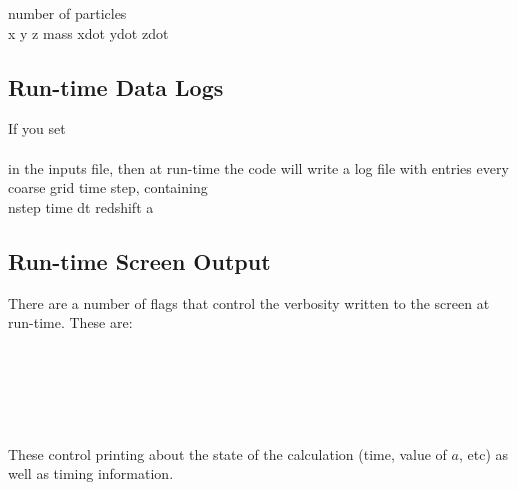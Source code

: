 \noindent number of particles \\ 
x y z mass xdot ydot zdot \\

\subsection{Run-time Data Logs}

If you set \\

  \\

\noindent in the inputs file, then at run-time the code will write a log file with entries every coarse
grid time step, containing \\

\noindent nstep  time   dt   redshift   a


\subsection{Run-time Screen Output}

There are a number of flags that control the verbosity written to the screen at run-time.  These are:

 \\
 \\
 \\
 \\
 \\

These control printing  about the state of the calculation (time, value of $a$, etc) as well as
timing information.
